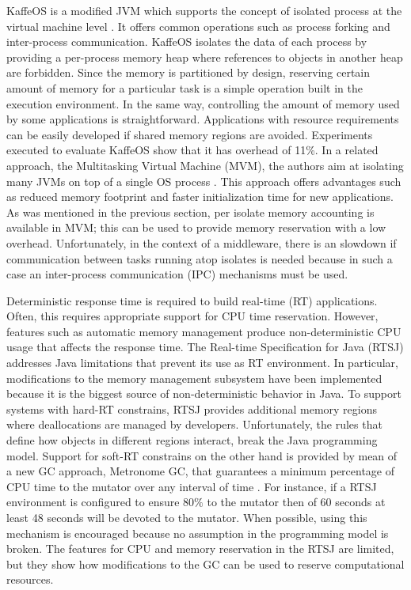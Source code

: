 KaffeOS is a modified JVM which supports the concept of isolated process at the virtual machine level \cite{back_processes_2000, Back:2005:KJR:1075382.1075383}.
It offers common operations such as process forking and inter-process communication.
KaffeOS isolates the data of each process by providing a per-process memory heap where references to objects in another heap are forbidden.
Since the memory is partitioned by design, reserving certain amount of memory for a particular task is a simple operation built in the execution environment.
In the same way, controlling the amount of memory used by some applications is straightforward.
Applications with resource requirements can be easily developed if shared memory regions are avoided.
Experiments executed to evaluate KaffeOS show that it has overhead of 11\%.
In a related approach, the Multitasking Virtual Machine (MVM), the authors aim at isolating many JVMs on top of
a single OS process \cite{czajkowski_multitasking_2001}.
This approach offers advantages such as reduced memory footprint and faster initialization time for new applications.
As was mentioned in the previous section, per isolate memory accounting is available in MVM;
this can be used to provide memory reservation with a low overhead. 
Unfortunately, in the context of a middleware, there is an slowdown if communication between tasks running atop isolates is needed because in such a case an inter-process communication (IPC) mechanisms must be used.


Deterministic response time is required to build real-time (RT) applications.
Often, this requires appropriate support for CPU time reservation. 
However, features such as automatic memory management produce non-deterministic CPU usage that affects the response time.
The Real-time Specification for Java (RTSJ) addresses Java limitations that prevent its use as RT environment.
In particular, modifications to the memory management subsystem have been implemented because it is the biggest source of non-deterministic behavior in Java.
To support systems with hard-RT constrains, RTSJ provides additional memory regions where deallocations are managed by developers.
Unfortunately, the rules that define how objects in different regions interact, break the Java programming model.
Support for soft-RT constrains on the other hand is provided by mean of a new GC approach, Metronome GC,  that guarantees a minimum percentage of CPU time to the mutator over any interval of time \cite{Bacon03themetronome:}.
For instance, if a RTSJ environment is configured to ensure 80$\%$ to the mutator then of 60 seconds at least 48 seconds will be devoted to the mutator.
When possible, using this mechanism is encouraged because no assumption in the programming model is broken.
The features for CPU and memory reservation in the RTSJ are limited, but they show how modifications to the GC can be used to reserve computational resources. 

